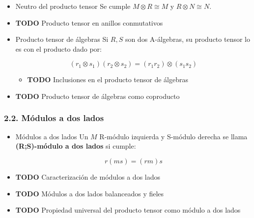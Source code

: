\documentclass[11pt]{article}
\begin{document}
\begin{itemize}
\item Neutro del producto tensor
\label{sec-7-2-1-4}
Se cumple $M \otimes R \cong M$ y $R \otimes N \cong N$.

\item {\bfseries\sffamily TODO} Producto tensor en anillos conmutativos
\label{sec-7-2-1-5}
\item Producto tensor de álgebras
\label{sec-7-2-1-6}
Si $R,S$ son dos A-álgebras, su producto tensor lo es con el producto
dado por:

\[
(r_1 \otimes s_1)(r_2 \otimes s_2) = (r_1r_2)\otimes(s_1s_2)
\]

\begin{itemize}
\item {\bfseries\sffamily TODO} Inclusiones en el producto tensor de álgebras
\label{sec-7-2-1-6-1}
\end{itemize}

\item {\bfseries\sffamily TODO} Producto tensor de álgebras como coproducto
\label{sec-7-2-1-7}
\end{itemize}
\subsubsection*{2.2. Módulos a dos lados}
\label{sec-7-2-2}
\begin{itemize}
\item Módulos a dos lados
\label{sec-7-2-2-1}
Un $M$ R-módulo izquierda y S-módulo derecha se llama \textbf{(R;S)-módulo a dos lados}
si cumple:

\[
r(ms)=(rm)s
\]

\item {\bfseries\sffamily TODO} Caracterización de módulos a dos lados
\label{sec-7-2-2-2}
\item {\bfseries\sffamily TODO} Módulos a dos lados balanceados y fieles
\label{sec-7-2-2-3}
\item {\bfseries\sffamily TODO} Propiedad universal del producto tensor como módulo a dos lados
\label{sec-7-2-2-4}
\end{itemize}
\end{document}
